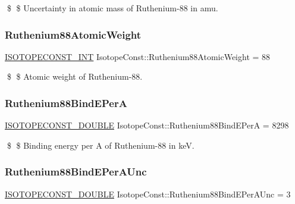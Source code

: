 \$ \$ Uncertainty in atomic mass of Ruthenium-\/88 in amu. \mbox{\label{group___isotope_const-_ruthenium-_ru88_gae27fc972a298234b8a7b994806b57fc9}} 
\subsubsection{\texorpdfstring{Ruthenium88\+Atomic\+Weight}{Ruthenium88AtomicWeight}}
{\footnotesize\ttfamily \mbox{\hyperlink{group___isotope_const-_macros_ga5f18360b3e99483a35c32d789e62621c}{I\+S\+O\+T\+O\+P\+E\+C\+O\+N\+S\+T\+\_\+\+I\+NT}} Isotope\+Const\+::\+Ruthenium88\+Atomic\+Weight = 88}

\$ \$ Atomic weight of Ruthenium-\/88. \mbox{\label{group___isotope_const-_ruthenium-_ru88_ga3f7a877ee658195dc64412fd0d02d599}} 
\subsubsection{\texorpdfstring{Ruthenium88\+Bind\+E\+PerA}{Ruthenium88BindEPerA}}
{\footnotesize\ttfamily \mbox{\hyperlink{group___isotope_const-_macros_ga8f45a7272ce02c0b4c65c44636ed719a}{I\+S\+O\+T\+O\+P\+E\+C\+O\+N\+S\+T\+\_\+\+D\+O\+U\+B\+LE}} Isotope\+Const\+::\+Ruthenium88\+Bind\+E\+PerA = 8298}

\$ \$ Binding energy per A of Ruthenium-\/88 in keV. \mbox{\label{group___isotope_const-_ruthenium-_ru88_gadd78fb4e127db00d2fd5a36c7215553f}} 
\subsubsection{\texorpdfstring{Ruthenium88\+Bind\+E\+Per\+A\+Unc}{Ruthenium88BindEPerAUnc}}
{\footnotesize\ttfamily \mbox{\hyperlink{group___isotope_const-_macros_ga8f45a7272ce02c0b4c65c44636ed719a}{I\+S\+O\+T\+O\+P\+E\+C\+O\+N\+S\+T\+\_\+\+D\+O\+U\+B\+LE}} Isotope\+Const\+::\+Ruthenium88\+Bind\+E\+Per\+A\+Unc = 3}

